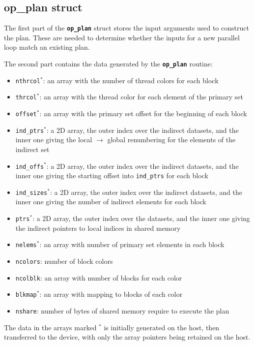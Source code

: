 \documentclass[12pt]{article}
\begin{document}
\subsection{op\_plan struct}

The first part of the {\tt \bf op\_plan} struct stores the input arguments
used to construct the plan. These are needed to determine whether the inputs 
for a new parallel loop match an existing plan.

The second part contains the data generated by the {\tt \bf op\_plan} routine:
\begin{itemize}
\item {\tt nthrcol${}^*$}:
an array with the number of thread colors for each block
\item {\tt thrcol${}^*$}:
an array with the thread color for each element of the primary set
\item {\tt offset${}^*$}:
an array with the primary set offset for the beginning of each block
\item {\tt ind\_ptrs${}^*$}:
a 2D array, the outer index over the indirect datasets, and the inner one giving the 
local $\rightarrow$ global renumbering for the elements of the indirect set
\item {\tt ind\_offs${}^*$}:
a 2D array, the outer index over the indirect datasets, and the inner one giving the 
starting offset into {\tt ind\_ptrs} for each block
\item {\tt ind\_sizes${}^*$}:
a 2D array, the outer index over the indirect datasets, and the inner one giving the
number of indirect elements for each block
\item {\tt ptrs${}^*$}:
a 2D array, the outer index over the datasets, and the inner one giving the indirect 
pointers to local indices in shared memory
\item {\tt nelems${}^*$}:
an array with number of primary set elements in each block
\item {\tt ncolors}:
number of block colors
\item {\tt ncolblk}:
an array with number of blocks for each color
\item {\tt blkmap${}^*$}:
an array with mapping to blocks of each color
\item {\tt nshare}:
number of bytes of shared memory require to execute the plan
\end{itemize}

The data in the arrays marked ${}^*$ is initially generated on the host, then 
transferred to the device, with only the array pointers being retained on the host.
\end{document}
